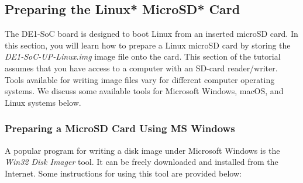 \documentclass[11pt, twoside, pdftex]{article}
\begin{document}
\subsection{Preparing the Linux* MicroSD* Card}

The DE1-SoC board is designed to boot Linux from an inserted microSD card. In this section, 
you will learn how to prepare a Linux microSD card by storing the
\textit{DE1-SoC-UP-Linux.img} image file onto the card. 
This section of the tutorial assumes that you have access to a 
computer with an SD-card reader/writer. Tools available for writing image files vary
for different computer operating systems. We discuss some available tools for Microsoft
Windows, macOS, and Linux systems below.

\subsubsection{Preparing a MicroSD Card Using MS Windows}

A popular program for writing a disk image under Microsoft Windows is 
the \textit{Win32 Disk Imager} tool. It can be freely downloaded and installed from
the Internet. Some instructions for using this tool are provided below:
\end{document}
